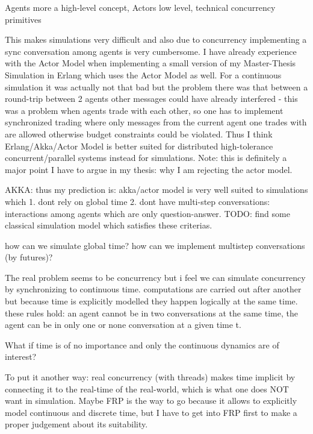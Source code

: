 Agents more a high-level concept, Actors low level, technical concurrency primitives

This makes simulations very difficult and also due to concurrency implementing a sync conversation among agents is very cumbersome. I have already experience with the Actor Model when implementing a small version of my Master-Thesis Simulation in Erlang which uses the Actor Model as well. For a continuous simulation it was actually not that bad but the problem there was that between a round-trip between 2 agents other messages could have already interfered - this was a problem when agents trade with each other, so one has to implement synchronized trading where only messages from the current agent one trades with are allowed otherwise budget constraints could be violated. Thus I think Erlang/Akka/Actor Model is better suited for distributed high-tolerance concurrent/parallel systems instead for simulations. Note: this is definitely a major point I have to argue in my thesis: why I am rejecting the actor model.


AKKA: thus my prediction is: akka/actor model is very well suited to simulations which 1. dont rely on global time 2. dont have multi-step conversations: interactions among agents which are only question-answer. TODO: find some classical simulation model which satisfies these criterias.

how can we simulate global time? how can we implement multistep conversations (by futures)?

The real problem seems to be concurrency but i feel we can simulate concurrency by synchronizing to continuous time. computations are carried out after another but because time is explicitly modelled they happen logically at the same time. these rules hold: an agent cannot be in two conversations at the same time, the agent can be in only one or none conversation at a given time t.

What if time is of no importance and only the continuous dynamics are of interest?

To put it another way: real concurrency (with threads) makes time implicit by connecting it to the real-time of the real-world, which is what one does NOT want in simulation. Maybe FRP is the way to go because it allows to explicitly model continuous and discrete time, but I have to get into FRP first to make a proper judgement about its suitability.

